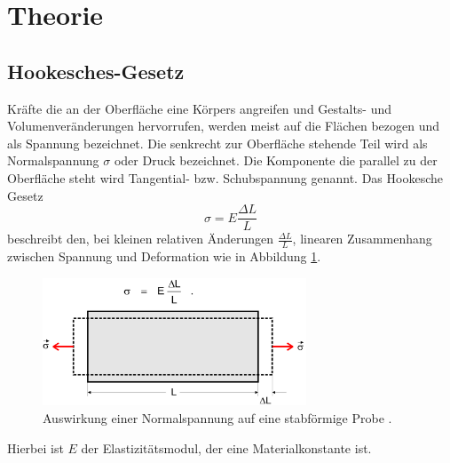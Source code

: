 \section{Theorie}
\label{sec:Theorie}
\subsection{Hookesches-Gesetz}
Kräfte die an der Oberfläche eine Körpers angreifen und Gestalts- und Volumenveränderungen
hervorrufen, werden meist auf die Flächen bezogen und als Spannung bezeichnet.
Die senkrecht zur Oberfläche stehende Teil wird als Normalspannung $\sigma$ oder
Druck bezeichnet. Die Komponente die parallel zu der Oberfläche steht wird Tangential-
bzw. Schubspannung genannt. Das Hookesche Gesetz
\begin{equation}
  \sigma=E\frac{\Delta L}{L}
\end{equation}
beschreibt den, bei kleinen relativen Änderungen $\frac{\Delta L}{L}$, linearen
Zusammenhang zwischen Spannung und Deformation wie in Abbildung \ref{fig:Spannung}.
\begin{figure}[H]
  \centering
  \includegraphics[width=0.7\textwidth]{spannung.png}
  \caption{Auswirkung einer Normalspannung auf eine stabförmige Probe \cite{sample} .}
  \label{fig:Spannung}
\end{figure}
Hierbei ist $E$ der Elastizitätsmodul, der eine Materialkonstante ist.

